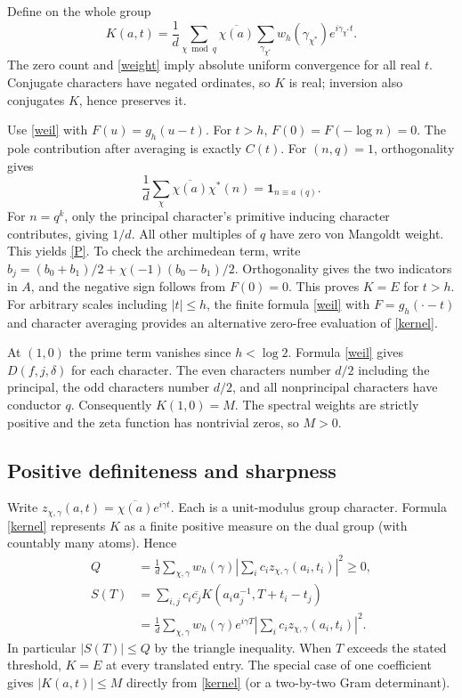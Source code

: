 \documentclass[11pt]{article}
\newcommand{\one}{\mathbf 1}
\begin{document}
Define on the whole group
\begin{equation}\label{kernel}
 K(a,t)=\frac1d\sum_{\chi\bmod q}\overline{\chi(a)}\sum_{\gamma_{\chi^*}}w_h(\gamma_{\chi^*})e^{i\gamma_{\chi^*}t}.
\end{equation}
The zero count and \eqref{weight} imply absolute uniform convergence for all real $t$. Conjugate characters have negated ordinates, so $K$ is real; inversion also conjugates $K$, hence preserves it.

Use \eqref{weil} with $F(u)=g_h(u-t)$. For $t>h$, $F(0)=F(-\log n)=0$. The pole contribution after averaging is exactly $C(t)$. For $(n,q)=1$, orthogonality gives
\[
 \frac1d\sum_\chi\overline{\chi(a)}\chi^*(n)=\one_{n\equiv a\ (q)}.
\]
For $n=q^k$, only the principal character's primitive inducing character contributes, giving $1/d$. All other multiples of $q$ have zero von Mangoldt weight. This yields \eqref{P}. To check the archimedean term, write $b_j=(b_0+b_1)/2+\chi(-1)(b_0-b_1)/2$. Orthogonality gives the two indicators in $A$, and the negative sign follows from $F(0)=0$. This proves $K=E$ for $t>h$. For arbitrary scales including $|t|\le h$, the finite formula \eqref{weil} with $F=g_h(\cdot-t)$ and character averaging provides an alternative zero-free evaluation of \eqref{kernel}.

At $(1,0)$ the prime term vanishes since $h<\log2$. Formula \eqref{weil} gives $D(f,j,\delta)$ for each character. The even characters number $d/2$ including the principal, the odd characters number $d/2$, and all nonprincipal characters have conductor $q$. Consequently $K(1,0)=M$. The spectral weights are strictly positive and the zeta function has nontrivial zeros, so $M>0$.

\subsection{Positive definiteness and sharpness}
Write $z_{\chi,\gamma}(a,t)=\overline{\chi(a)}e^{i\gamma t}$. Each is a unit-modulus group character. Formula \eqref{kernel} represents $K$ as a finite positive measure on the dual group (with countably many atoms). Hence
\begin{align*}
 Q&=\frac1d\sum_{\chi,\gamma}w_h(\gamma)
 \left|\sum_i c_i z_{\chi,\gamma}(a_i,t_i)\right|^2\ge0,\\
 S(T)&=\sum_{i,j}c_i\overline{c_j}K(a_i a_j^{-1},T+t_i-t_j)\\
 &=\frac1d\sum_{\chi,\gamma}w_h(\gamma)e^{i\gamma T}
 \left|\sum_i c_i z_{\chi,\gamma}(a_i,t_i)\right|^2.
\end{align*}
In particular $|S(T)|\le Q$ by the triangle inequality. When $T$ exceeds the stated threshold, $K=E$ at every translated entry. The special case of one coefficient gives $|K(a,t)|\le M$ directly from \eqref{kernel} (or a two-by-two Gram determinant).
\end{document}

